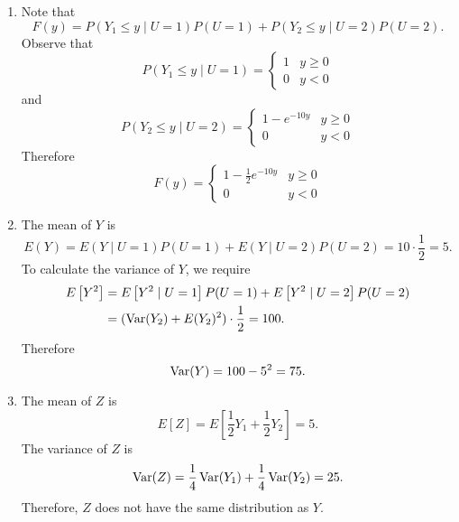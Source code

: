 \documentclass[notoc,notitlepage]{tufte-book}
\begin{document}
\begin{solution}
  \begin{enumerate}
    \item Note that
      \begin{equation*}
        F(y) = P( Y_1 \leq y \mid U = 1 ) P(U = 1) + P( Y_2 \leq y \mid U = 2 ) P(U = 2).
      \end{equation*}
      Observe that
      \begin{equation*}
        P(Y_1 \leq y \mid U = 1) = \begin{cases}
          1 & y \geq 0 \\
          0 & y < 0
        \end{cases}
      \end{equation*}
      and
      \begin{equation*}
        P(Y_2 \leq y \mid U = 2) = \begin{cases}
          1 - e^{-10y} & y \geq 0 \\
          0            & y < 0
        \end{cases}
      \end{equation*}
      Therefore
      \begin{equation*}
        F(y) = \begin{cases}
          1 - \frac{1}{2} e^{-10 y} & y \geq 0 \\
          0                         & y < 0
        \end{cases}
      \end{equation*}

    \item The mean of $Y$ is
      \begin{equation*}
        E(Y) = E(Y \mid U = 1) P(U = 1) + E(Y \mid U = 2) P(U = 2) = 10 \cdot \frac{1}{2} = 5.
      \end{equation*}
      To calculate the variance of $Y$, we require
      \begin{align*}
        E\left[Y^2\right] &= E\left[Y^2 \mid U = 1\right] P(U = 1) + E\left[Y^2 \mid U = 2\right] P(U = 2) \\
                          &= ( \operatorname{Var}(Y_2) + E(Y_2)^2 ) \cdot \frac{1}{2} = 100.
      \end{align*}
      Therefore
      \begin{equation*}
        \operatorname{Var}(Y) = 100 - 5^2 = 75.
      \end{equation*}

    \item The mean of $Z$ is
      \begin{equation*}
        E[Z] = E[ \frac{1}{2} Y_1 + \frac{1}{2} Y_2 ] = 5.
      \end{equation*}
      The variance of $Z$ is
      \begin{equation*}
        \operatorname{Var}(Z) = \frac{1}{4} \operatorname{Var}(Y_1) + \frac{1}{4} \operatorname{Var}(Y_2) = 25.
      \end{equation*}
      Therefore, $Z$ does not have the same distribution as $Y$.
  \end{enumerate}
\end{solution}
\end{document}
